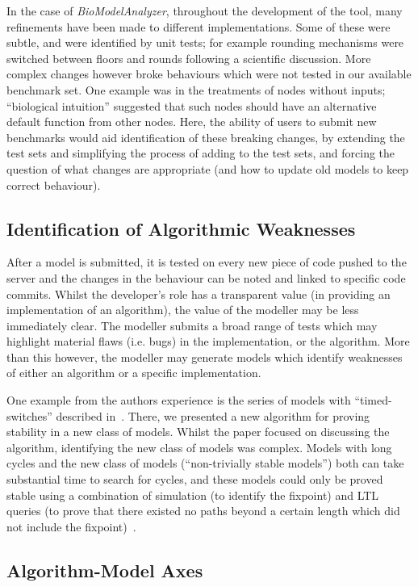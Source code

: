 \documentclass[conference]{IEEEtran}
\begin{document}
In the case of {\emph{BioModelAnalyzer}}, throughout the development of the
tool, many refinements have been made to different
implementations. Some of these were subtle, and were identified by
unit tests; for example rounding mechanisms were switched between
floors and rounds following a scientific discussion. More complex
changes however broke behaviours which were not tested in our
available benchmark set. One example was in the treatments of nodes
without inputs; ``biological intuition'' suggested that such nodes
should have an alternative default function from other nodes. Here,
the ability of users to submit new benchmarks would aid identification
of these breaking changes, by extending the test sets and simplifying
the process of adding to the test sets, and forcing the question of
what changes are appropriate (and how to update old models to keep
correct behaviour).


\subsection{Identification of Algorithmic Weaknesses}

After a model is submitted, it is tested on every new piece of code
pushed to the server and the changes in the behaviour can be noted and
linked to specific code commits. Whilst the developer's role has a
transparent value (in providing an implementation of an algorithm),
the value of the modeller may be less immediately clear. The modeller
submits a broad range of tests which may highlight material flaws
(i.e. bugs) in the implementation, or the algorithm. More than this
however, the modeller may generate models which identify weaknesses of
either an algorithm or a specific implementation.

One example from the authors experience is the series of models with
``timed-switches'' described in~\cite{cook-et-al:2014}. There, we
presented a new algorithm for proving stability in a new class of
models. Whilst the paper focused on discussing the algorithm,
identifying the new class of models was complex. Models with long
cycles and the new class of models (``non-trivially stable models'')
both can take substantial time to search for cycles, and these models
could only be proved stable using a combination of simulation (to
identify the fixpoint) and LTL queries (to prove that there existed
no paths beyond a certain length which did not include the
fixpoint)~\cite{claessen-et-al:2013}.

\subsection{Algorithm-Model Axes}
\end{document}
